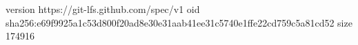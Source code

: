 version https://git-lfs.github.com/spec/v1
oid sha256:e69f9925a1c53d800f20ad8e30e31aab41ee31c5740e1ffe22cd759c5a81cd52
size 174916
